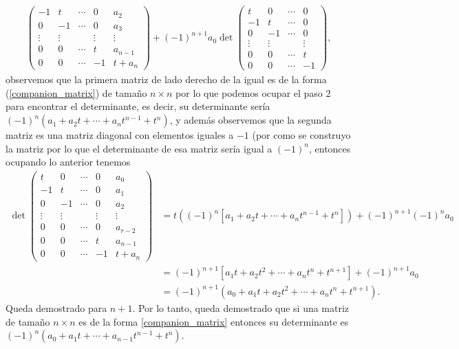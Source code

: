 \documentclass[11pt,letterpaper]{article}
\begin{document}
\begin{enumerate}
\begin{align*}
\begin{pmatrix}
-1 & t & \cdots & 0 & a_2\\
0 & -1 & \cdots & 0 & a_3\\
\vdots & \vdots &  & \vdots &\vdots\\
0 & 0 & \cdots & t & a_{n-1}\\
0 & 0 & \cdots & -1 & t+a_{n}
\end{pmatrix}+(-1)^{n+1}a_0\det\begin{pmatrix}
t & 0 & \cdots & 0 \\
-1 & t & \cdots & 0\\
0 & -1 & \cdots & 0\\
\vdots & \vdots &   &\vdots\\
0 & 0 & \cdots & t \\
0 & 0 & \cdots & -1
\end{pmatrix},
\end{align*}
observemos que la primera matriz de lado derecho de la igual es de la forma (\ref{companion_matrix}) de tamaño $n\times n$ por lo que podemos ocupar el paso 2 para encontrar el determinante, es decir, su determinante sería $(-1)^n(a_1+a_2t+\cdots+a_nt^{n-1}+t^n)$, y además observemos que la segunda matriz es una matriz diagonal con elementos iguales a $-1$ (por como se construyo la matriz por lo que el determinante de esa matriz sería igual a $(-1)^n$, entonces ocupando lo anterior tenemos 
\begin{align*}
\det \begin{pmatrix}
t & 0 & \cdots & 0 & a_0\\
-1 & t & \cdots & 0 & a_1\\
0 & -1 & \cdots & 0 & a_2\\
\vdots & \vdots &  & \vdots &\vdots\\
0 & 0 & \cdots & 0 & a_{r-2}\\
0 & 0 & \cdots & t & a_{n-1}\\
0 & 0 & \cdots & -1 & t+a_{n}
\end{pmatrix}&= t ((-1)^{n}[a_1+a_2t+\cdots+a_nt^{n-1}+t^n])+(-1)^{n+1}(-1)^na_0\\
&=(-1)^{n+1}[a_1t+a_2t^2+\cdots+a_nt^{n}+t^{n+1}]+(-1)^{n+1}a_0\\
&=(-1)^{n+1}(a_0+a_1t+a_2t^2+\cdots+a_nt^{n}+t^{n+1}).
\end{align*}
Queda demostrado para $n+1$. Por lo tanto, queda demostrado que si una matriz de tamaño $n\times n$ es de la forma \ref{companion_matrix} entonces su determinante es  $(-1)^n(a_0+a_1t+\cdots+a_{n-1}t^{n-1}+t^n)$. 


\end{enumerate}
\end{document}
